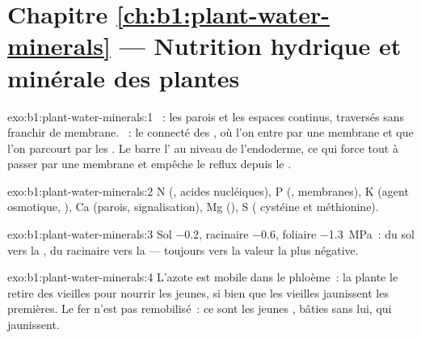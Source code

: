 \section*{Chapitre \ref{ch:b1:plant-water-minerals} --- Nutrition hydrique et minérale des plantes}

\begin{solution}{exo:b1:plant-water-minerals:1}
~: les parois et les espaces continus, traversés sans franchir
de membrane. ~: le  connecté des , où l'on
entre par une membrane et que l'on parcourt par les . Le
 barre l' au niveau de l'endoderme, ce qui
force tout à passer par une membrane et empêche le reflux depuis le
.
\end{solution}

\begin{solution}{exo:b1:plant-water-minerals:2}
N (, acides nucléiques), P (, membranes), K (agent
osmotique, ), Ca (parois, signalisation), Mg (),
S ( cystéine et méthionine).
\end{solution}

\begin{solution}{exo:b1:plant-water-minerals:3}
Sol \qty{-0.2}{},  racinaire \qty{-0.6}{},  foliaire
\qty{-1.3}{MPa}~: du sol vers la , du  racinaire vers la
 --- toujours vers la valeur la plus négative.
\end{solution}

\begin{solution}{exo:b1:plant-water-minerals:4}
L'azote est mobile dans le phloème~: la plante le retire des vieilles
 pour nourrir les jeunes, si bien que les vieilles jaunissent
les premières. Le fer n'est pas remobilisé~: ce sont les jeunes
, bâties sans lui, qui jaunissent.
\end{solution}

